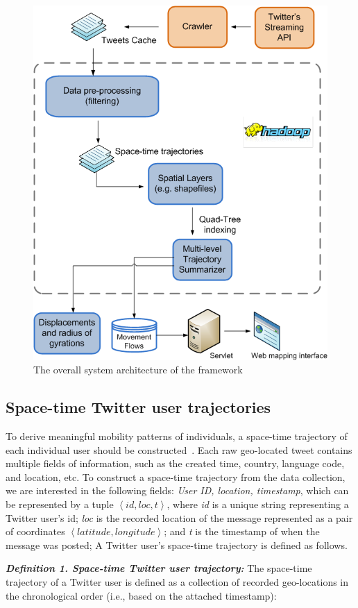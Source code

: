 \documentclass[a4paper, 11pt]{article}
\begin{document}
\begin{figure}[h]
\centering
\includegraphics[width=0.6\linewidth]{./figures/Overall_Architecture222}
\caption{The overall system architecture of the framework}
\label{fig:Arch}
\end{figure}
\FloatBarrier



\subsection{Space-time Twitter user trajectories}
To derive meaningful mobility patterns of individuals, a space-time trajectory of each individual user should be constructed~\citep{hagerstrand1985time}.
Each raw geo-located tweet contains multiple fields of information, such as the created time, country, language code, and location, etc. To construct a space-time trajectory from the data collection, we are interested in the following fields: \textit{User ID, location, timestamp}, which can be represented by a tuple $\left\langle id, loc, t\right\rangle$, where \textit{id} is a unique string representing a Twitter user's id; \textit{loc} is the recorded location of the message represented as a pair of coordinates $\left\langle latitude, longitude\right\rangle$;
and \textit{t} is the timestamp of when the message was posted; A Twitter user's space-time trajectory is defined as follows.
\newline

\noindent\emph{\textbf{Definition 1. Space-time Twitter user trajectory:}} The space-time trajectory of a Twitter user is defined as a collection of recorded geo-locations in the chronological order (i.e., based on the attached timestamp):
\newline
\end{document}
